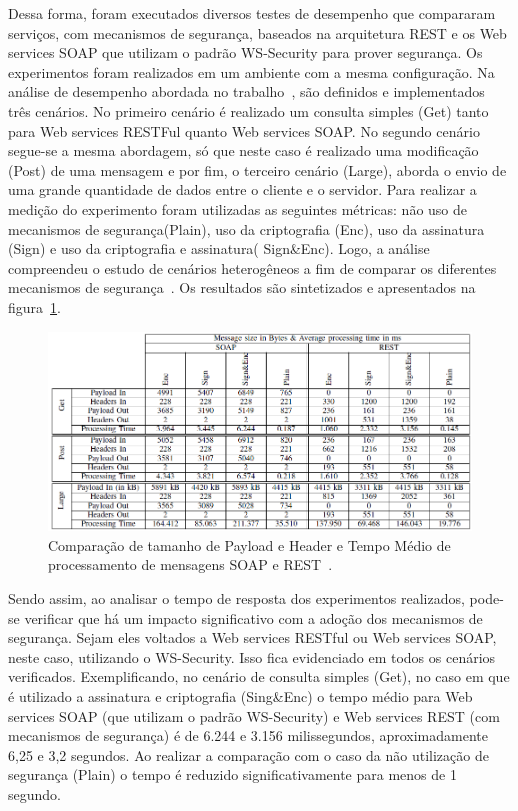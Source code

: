 Dessa forma, foram executados diversos testes de desempenho que compararam  serviços, com mecanismos de segurança, baseados na arquitetura REST e os  Web services SOAP que utilizam o padrão WS-Security para prover segurança. Os experimentos foram realizados em um ambiente com a mesma configuração. Na análise de desempenho abordada no trabalho~\cite{verstichel}, são definidos e implementados três cenários. No primeiro cenário é realizado um consulta simples (Get) tanto para Web services RESTFul quanto Web services SOAP. No segundo cenário  segue-se a mesma abordagem, só que neste caso é realizado uma  modificação (Post) de uma mensagem e por fim, o terceiro cenário (Large), aborda o envio de uma grande quantidade de dados entre o cliente e o servidor. Para realizar a medição do experimento foram utilizadas as seguintes métricas: não uso de mecanismos de segurança(Plain),  uso da criptografia (Enc), uso da assinatura (Sign) e uso da criptografia e assinatura( Sign\&Enc). Logo, a análise compreendeu o estudo de cenários heterogêneos a fim de comparar os diferentes mecanismos de segurança~\cite{verstichel}. Os resultados são sintetizados e apresentados na figura~\ref{fig:comparativoSOAP_REST}.

\begin{figure}[!htb]
    \centering
    \includegraphics[width=1.0\textwidth]{analise_desempenho_estudo2.png}
    \caption{Comparação de tamanho de Payload e Header e Tempo Médio de processamento de mensagens SOAP e REST~\cite{verstichel}.}
    \label{fig:comparativoSOAP_REST}
\end{figure}

Sendo assim, ao analisar o tempo de resposta dos experimentos realizados, pode-se verificar que há um impacto significativo com a adoção dos mecanismos de segurança. Sejam eles voltados a Web services RESTful ou Web services SOAP, neste caso, utilizando o WS-Security. Isso fica evidenciado em todos os cenários verificados. Exemplificando, no cenário de consulta simples (Get), no caso em que é utilizado a assinatura e criptografia (Sing\&Enc) o tempo médio para Web services SOAP (que utilizam o padrão WS-Security) e Web services REST (com mecanismos de segurança) é de 6.244 e 3.156 milissegundos, aproximadamente 6,25 e 3,2 segundos. Ao realizar a comparação com o caso da não utilização de segurança (Plain) o tempo é reduzido significativamente para menos de 1 segundo.

